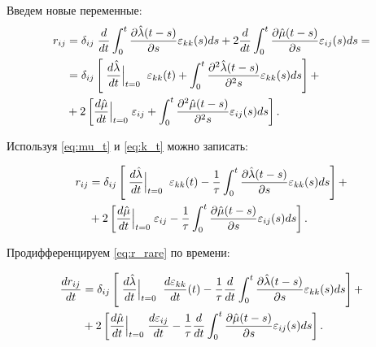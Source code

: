 \documentclass[a4paper, fontsize=14pt]{article}
\begin{document}
Введем новые переменные:
\begin{equation*}
    \begin{aligned}
        r_{ij} &= \delta_{ij} \; \frac{d}{dt} \int_0^t \frac{\partial \hat{\lambda}(t - s)}{\partial s}  \varepsilon_{kk}(s) ds + 2 \frac{d}{dt} \int_0^t \frac{\partial \hat{\mu}(t - s)}{\partial s}  \varepsilon_{ij}(s) ds = \\
           & = \delta_{ij} \left[\; \frac{d \hat{\lambda}}{d t}\Big{|}_{t = 0} \;  \; \varepsilon_{kk} (t) + \int_0^t \frac{\partial^2 \hat{\lambda}(t - s)}{\partial^2 s} \varepsilon_{kk}(s) ds \right] + \\ 
           & + 2 \left[ \frac{d \hat{\mu}}{d t}\Big{|}_{t = 0} \;  \varepsilon_{ij} + \int_0^t \frac{\partial^2 \hat{\mu}(t - s)}{\partial^2 s} \varepsilon_{ij}(s) ds \right] 
    .\end{aligned}
\end{equation*}

Используя \eqref{eq:mu_t} и \eqref{eq:k_t} можно записать:

\begin{equation}
    \label{eq:r_rare}
    \begin{aligned}
        r_{ij} &= \delta_{ij} \left[\; \frac{d \hat{\lambda}}{d t}\Big{|}_{t = 0} \;  \; \varepsilon_{kk} (t) - \frac{1}{\tau} \int_0^t \frac{\partial \hat{\lambda}(t - s)}{\partial s} \varepsilon_{kk}(s) ds \right] + \\ 
           & + 2 \left[ \frac{d \hat{\mu}}{d t}\Big{|}_{t = 0} \;  \varepsilon_{ij} - \frac{1}{\tau} \int_0^t \frac{\partial \hat{\mu}(t - s)}{\partial s} \varepsilon_{ij}(s) ds \right].
    \end{aligned}
\end{equation}

Продифференцируем \eqref{eq:r_rare} по времени:

\begin{equation*}
    \begin{aligned}
        \frac{d r_{ij}}{dt} &= \delta_{ij} \left[\; \frac{d \hat{\lambda}}{d t}\Big{|}_{t = 0} \;  \; \frac{d \varepsilon_{kk}}{dt}  (t) - \frac{1}{\tau} \frac{d}{dt} \int_0^t \frac{\partial \hat{\lambda}(t - s)}{\partial s} \varepsilon_{kk}(s) ds \right] + \\ 
           & + 2 \left[\frac{d \hat{\mu}}{d t}\Big{|}_{t = 0} \; \frac{d \varepsilon_{ij}}{dt}  - \frac{1}{\tau} \frac{d}{dt} \int_0^t \frac{\partial \hat{\mu}(t - s)}{\partial s} \varepsilon_{ij}(s) ds \right].
    \end{aligned}
\end{equation*}
\end{document}
